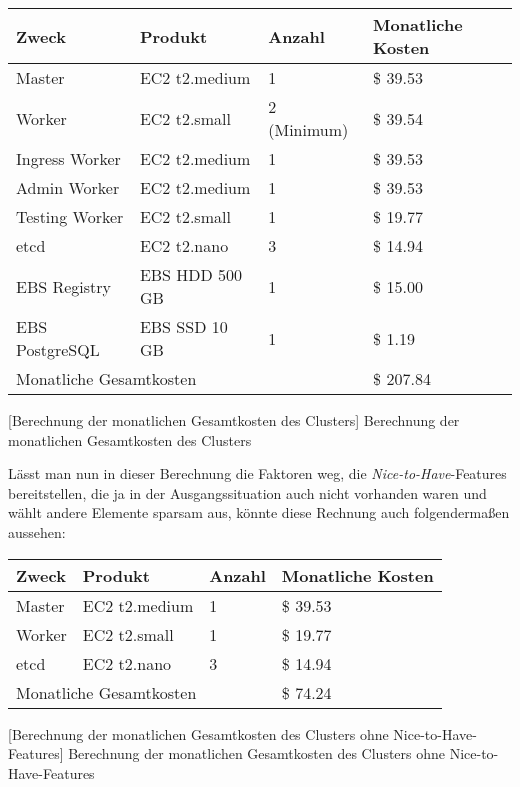 \begin{flushleft}
\centering
\begin{tabular}{ | l | l | l | l | }
  \hline
  Zweck          & Produkt & Anzahl & Monatliche Kosten \\ \hline \hline
  Master         & EC2 t2.medium  & 1 & \$ 39.53 \\ \hline
  Worker         & EC2 t2.small   & 2 (Minimum) & \$ 39.54 \\ \hline
  Ingress Worker & EC2 t2.medium  & 1 & \$ 39.53 \\ \hline
  Admin Worker   & EC2 t2.medium  & 1 & \$ 39.53 \\ \hline
  Testing Worker & EC2 t2.small   & 1 & \$ 19.77 \\ \hline
  etcd           & EC2 t2.nano    & 3 & \$ 14.94 \\ \hline
  EBS Registry   & EBS HDD 500 GB & 1 & \$ 15.00 \\ \hline
  EBS PostgreSQL & EBS SSD 10 GB  & 1 & \$ 1.19 \\ \hline \hline
  \multicolumn{3}{|l|}{Monatliche Gesamtkosten} & \$ 207.84 \\ \hline
\end{tabular}
    [Berechnung der monatlichen Gesamtkosten des Clusters]
    {Berechnung der monatlichen Gesamtkosten des Clusters}
\end{flushleft}

Lässt man nun in dieser Berechnung die Faktoren weg,
die \emph{Nice-to-Have}-Features bereitstellen,
die ja in der Ausgangssituation auch nicht vorhanden waren
und wählt andere Elemente sparsam aus,
könnte diese Rechnung auch folgendermaßen aussehen:

\begin{flushleft}
\centering
\begin{tabular}{ | l | l | l | l | }
  \hline
  Zweck          & Produkt & Anzahl & Monatliche Kosten \\ \hline \hline
  Master         & EC2 t2.medium  & 1 & \$ 39.53 \\ \hline
  Worker         & EC2 t2.small   & 1 & \$ 19.77 \\ \hline
  etcd           & EC2 t2.nano    & 3 & \$ 14.94 \\ \hline
  \multicolumn{3}{|l|}{Monatliche Gesamtkosten} & \$ 74.24 \\ \hline
\end{tabular}
    [Berechnung der monatlichen Gesamtkosten des Clusters ohne Nice-to-Have-Features]
    {Berechnung der monatlichen Gesamtkosten des Clusters ohne Nice-to-Have-Features}
\end{flushleft}

